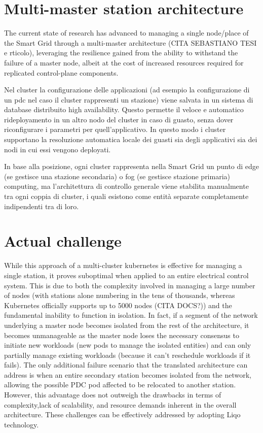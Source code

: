 \section{Multi-master station architecture}
The current state of research has advanced to managing a single node/place of the Smart Grid through a multi-master architecture (CITA SEBASTIANO TESI e rticolo), leveraging the resilience gained from the ability to withstand the failure of a master node, albeit at the cost of increased resources required for replicated control-plane components.

Nel cluster la configurazione delle applicazioni (ad esempio la configurazione di un pdc nel caso il cluster rappresenti un stazione) viene salvata in un sistema di database distribuito high availability. Questo permette il veloce e automatico rideployamento in un altro nodo del cluster in caso di guasto, senza dover riconfigurare i parametri per quell'applicativo.
In questo modo i cluster supportano la resoluzione automatica locale dei guasti sia degli applicativi sia dei nodi in cui essi vengono deployati.

In base alla posizione, ogni cluster rappresenta nella Smart Grid un punto di edge (se gestisce una stazione secondaria) o fog (se gestisce stazione primaria) computing, ma l'architettura di controllo generale viene stabilita manualmente tra ogni coppia di cluster, i quali esistono come entità separate completamente indipendenti tra di loro.

\section{Actual challenge}
While this approach of a multi-cluster kubernetes is effective for managing a single station, it proves suboptimal when applied to an entire electrical control system. This is due to both the complexity involved in managing a large number of nodes (with stations alone numbering in the tens of thousands, whereas Kubernetes officially supports up to 5000 nodes (CITA DOCS?)) and the fundamental inability to function in isolation. In fact, if a segment of the network underlying a master node becomes isolated from the rest of the architecture, it becomes unmanageable as the master node loses the necessary consensus to initiate new workloads (new pods to manage the isolated entities) and can only partially manage existing workloads (because it can't reschedule workloads if it fails).
The only additional failure scenario that the translated architecture can address is when an entire secondary station becomes isolated from the network, allowing the possible PDC pod affected to be relocated to another station. However, this advantage does not outweigh the drawbacks in terms of complexity,lack of scalability, and resource demands inherent in the overall architecture. These challenges can be effectively addressed by adopting Liqo technology.
